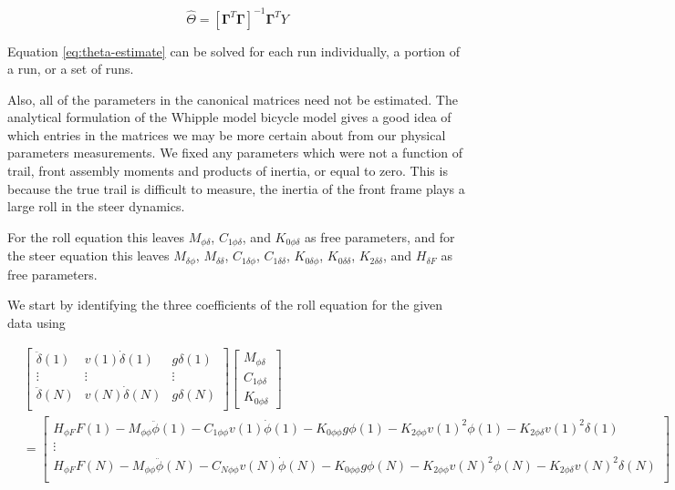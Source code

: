 \documentclass[a4paper]{article}
\begin{document}
\begin{equation}
  \hat{\Theta} = [\mathbf{\Gamma}^T \mathbf{\Gamma}]^{-1} \mathbf{\Gamma}^T Y
  \label{eq:theta-estimate}
\end{equation}

Equation \ref{eq:theta-estimate} can be solved for each run individually, a
portion of a run, or a set of runs.

Also, all of the parameters in the canonical matrices need not be estimated.
The analytical formulation of the Whipple model bicycle model
\cite{Meijaard2007} gives a good idea of which entries in the matrices we may
be more certain about from our physical parameters measurements. We fixed any
parameters which were not a function of trail, front assembly moments and
products of inertia, or equal to zero. This is because the true trail is
difficult to measure, the inertia of the front frame plays a large roll in the
steer dynamics.

For the roll equation this leaves $M_{\phi\delta}$, $C_{1\phi\delta}$,
and $K_{0\phi\delta}$ as free parameters, and for the steer equation
this leaves $M_{\delta\phi}$, $M_{\delta\delta}$, $C_{1\delta\phi}$,
$C_{1\delta\delta}$, $K_{0\delta\phi}$, $K_{0\delta\delta}$,
$K_{2\delta\delta}$, and $H_{\delta F}$ as free parameters.

We start by identifying the three coefficients of the roll equation for
the given data using

\begin{align}
  &\begin{bmatrix}
     \ddot{\delta}(1) &
     v(1) \dot{\delta}(1) &
     g \delta(1) \\
     \vdots & \vdots & \vdots\\
     \ddot{\delta}(N) &
     v(N) \dot{\delta}(N) &
     g \delta(N) \\
  \end{bmatrix}
  \begin{bmatrix}
    M_{\phi\delta} \\
    C_{1\phi\delta} \\
    K_{0\phi\delta}
  \end{bmatrix}\\
  &=
  \begin{bmatrix}
    H_{\phi F} F(1)
    - M_{\phi\phi} \ddot{\phi}(1)
    - C_{1\phi\phi} v(1) \dot{\phi}(1)
    - K_{0\phi\phi} g \phi(1)
    - K_{2\phi\phi} v(1)^2 \phi(1)
    - K_{2\phi\delta} v(1)^2 \delta(1) \\
  \vdots\\
    H_{\phi F} F(N)
    - M_{\phi\phi} \ddot{\phi}(N)
    - C_{N\phi\phi} v(N) \dot{\phi}(N)
    - K_{0\phi\phi} g \phi(N)
    - K_{2\phi\phi} v(N)^2 \phi(N)
    - K_{2\phi\delta} v(N)^2 \delta(N) \\
  \end{bmatrix} \nonumber
\end{align}
\end{document}
